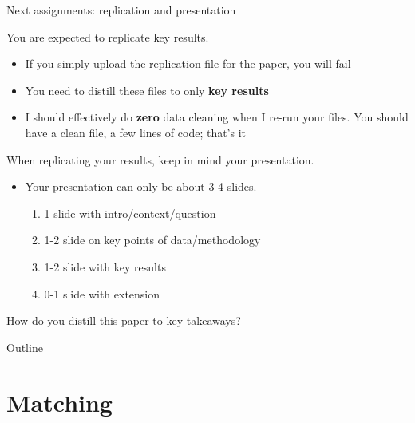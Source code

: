 \documentclass[compress, 8pt]{beamer}
\begin{document}
\begin{frame}{Next assignments: replication and presentation}

You are expected to replicate key results. 
\begin{itemize}
    \item If you simply upload the replication file for the paper, you will fail
    \item You need to distill these files to only \textbf{key results}
    \item I should effectively do \textbf{zero} data cleaning when I re-run your files. You should have a clean file, a few lines of code; that's it
\end{itemize}

\vspace{2ex}
When replicating your results, keep in mind your presentation.
\begin{itemize}
    \item Your presentation can only be about 3-4 slides. 
    \begin{enumerate}
        \item 1 slide with intro/context/question
        \item 1-2 slide on key points of data/methodology
        \item 1-2 slide with key results
        \item 0-1 slide with extension
    \end{enumerate}
\end{itemize}
How do you distill this paper to key takeaways?
\end{frame}


\miniframesoff
\begin{frame}{Outline}
    \tableofcontents
\end{frame}
\miniframeson

\section[Matching]{Matching}
\miniframesoff
\begin{frame}
    \tableofcontents[currentsection]
\end{frame}
\miniframeson
\end{document}
